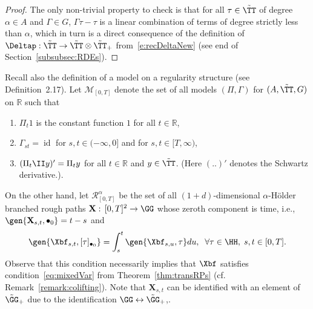 \documentclass{article}
\begin{document}
\begin{proof}
The only non-trivial property to check is that for all $\tau \in \tilde \TT$ of degree $\alpha \in A$ and $\Gamma \in G$, $\Gamma \tau - \tau$ is a linear combination of terms of degree strictly less than $\alpha$, which in turn is a direct consequence of the definition of $\Deltap : \tilde \TT \rightarrow \tilde \TT \otimes \tilde \TT_+$ from~\eqref{e:recDeltaNew} (see end of Section~\ref{subsubsec:RDEs}).
\end{proof}

Recall also the definition of a model on a regularity structure (see~\cite{Hairer14} Definition~2.17). Let $\mathscr{M}_{[0,T]}$ denote the set of all models $(\Pi,\Gamma)$ for $(A,\tilde\TT, G)$ on $\mathbb{R}$ such that
\begin{enumerate}[label={(\roman*)}]
 \item\label{point:M1} $\Pi_t 1$ is the constant function $1$ for all $t\in\mathbb{R}$,
 \item\label{point:M2} $\Gamma_{st}=\operatorname{id}$ for $s,t\in(-\infty,0]$ and for $s,t\in[T,\infty)$,
 \item\label{point:M3} $(\Pi_t\II y)'=\Pi_t y$ for all $t\in\mathbb{R}$ and $y\in\tilde \TT$. (Here $(..)'$ denotes the Schwartz derivative.).
\end{enumerate}


\medskip
\medskip

On the other hand, let $\mathscr{R}^\alpha_{[0,T]}$ be the set of all $(1+d)$-dimensional $\alpha$-H\"{o}lder branched rough paths $\mathbf{X}:\,[0,T]^2\rightarrow \GG$ whose zeroth component is time, i.e., $\gen{\mathbf{X}_{s,t}, \bullet_0} = t-s$ and
\begin{equation}\label{eq:zeroTime}
\gen{\Xbf_{s,t}, [\tau]_{\bullet_0}} = \int_{s}^t \gen{\Xbf_{s,u}, \tau} du, \; \; \forall \tau \in \HH, \; s,t \in [0,T].
\end{equation}
Observe that this condition necessarily implies that $\Xbf$ satisfies condition~\eqref{eq:mixedVar} from Theorem~\ref{thm:transRPs} (cf. Remark~\ref{remark:colifting}). Note that $\mathbf{X}_{s,t}$ can be identified with an element of $\tilde \GG_+$ due to the identification $\GG \leftrightarrow \tilde \GG_+$,.
\end{document}
